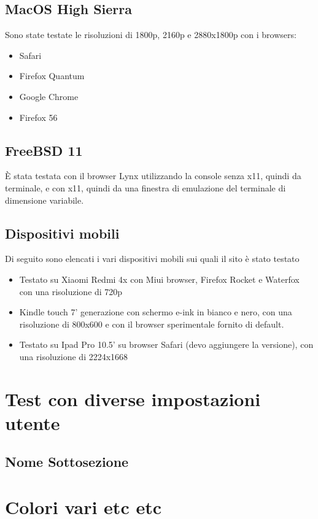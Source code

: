 \documentclass[openany, a4paper, 12pt]{report}
\begin{document}
				\subsection{MacOS High Sierra}
				Sono state testate le risoluzioni di 1800p, 2160p e 2880x1800p con i browsers:
				\begin{itemize}
					\item Safari
					\item Firefox Quantum
					\item Google Chrome
					\item Firefox 56
				\end{itemize}

				\subsection{FreeBSD 11}
				\`{E} stata testata con il browser Lynx utilizzando la console senza x11, quindi da terminale, e con x11, quindi da una finestra di emulazione del terminale di dimensione variabile.

				\subsection{Dispositivi mobili}
				Di seguito sono elencati i vari dispositivi mobili sui quali il sito è stato testato
				\begin{itemize}
				\item Testato su Xiaomi Redmi 4x con Miui browser, Firefox Rocket e Waterfox con una risoluzione di 720p
				\item Kindle touch 7' generazione con schermo e-ink in bianco e nero, con una risoluzione di 800x600 e con il browser sperimentale fornito di default.
        \item Testato su Ipad Pro 10.5' su browser Safari (devo aggiungere la versione), con una risoluzione di 2224x1668
				\end{itemize}
		\section{Test con diverse impostazioni utente}
			\subsection{Nome Sottosezione}
		\section{Colori vari etc etc}
\end{document}
